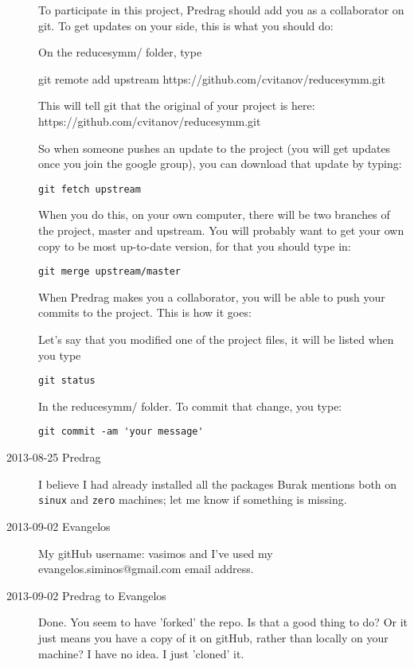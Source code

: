 \begin{description}
To participate in this project, Predrag should add you as a collaborator on git. To get updates on your side, this is what you should do:

On the reducesymm/ folder, type

git remote add upstream https://github.com/cvitanov/reducesymm.git

This will tell git that the original of your project is here: https://github.com/cvitanov/reducesymm.git

So when someone pushes an update to the project (you will get updates once you join the google group), you can download that update by typing:

\begin{verbatim}
git fetch upstream
\end{verbatim}

When you do this, on your own computer, there will  be two branches of the project, master and upstream. You will probably want to get your own copy to be most up-to-date version, for that you should type in:

\begin{verbatim}
git merge upstream/master
\end{verbatim}

When Predrag makes you a collaborator, you will be able to push your commits to the project. This is how it goes:

Let's say that you modified one of the project files, it will be listed when you type

\begin{verbatim}
git status
\end{verbatim}

In the reducesymm/ folder. To commit that change, you type:

\begin{verbatim}
git commit -am 'your message'
\end{verbatim}

\item[2013-08-25 Predrag] I believe I had already installed all the
packages Burak mentions both on \texttt{sinux} and \texttt{zero}
machines; let me know if something is missing.

\item[2013-09-02 Evangelos]
My gitHub username: vasimos and I've used my evangelos.siminos@gmail.com email address.


\item[2013-09-02 Predrag to Evangelos] Done. You seem to have 'forked' the repo. Is that a good thing to do? Or it just means you have a copy of it
    on gitHub, rather than locally on your machine? I have no idea. I just 'cloned' it.


\end{description}
